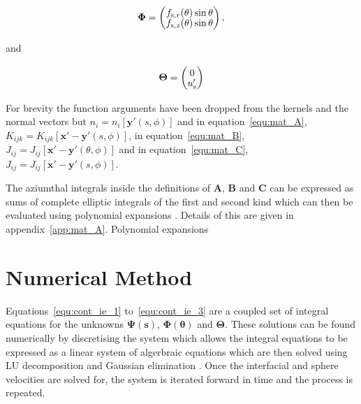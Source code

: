 \documentclass[12pt]{article}
\begin{document}
\begin{equation}
\setlength{\arraycolsep}{5pt}
\renewcommand{\arraystretch}{1.3}
\boldsymbol{\Phi} = \left( \begin{matrix}
f_{\text{s},r}(\theta) \sin\theta \\[-5pt]
f_{\text{s},z}(\theta) \sin\theta \\
\end{matrix} \right)  ,
\label{equ:vec_b}
\end{equation}

and 

\begin{equation}
\setlength{\arraycolsep}{5pt}
\renewcommand{\arraystretch}{1.3}
\boldsymbol{\Theta} = \left( \begin{matrix}
0 \\[-5pt]
u'_{\text{s}} \\
\end{matrix} \right) 
\label{equ:vec_d}
\end{equation}

For brevity the function arguments have been dropped from the kernels and the normal vectors but $n_{i} = n_{i}[\boldsymbol{y'}(s, \phi)]$ and in equation~\ref{equ:mat_A}, $K_{ijk} = K_{ijk}[\boldsymbol{x'} - \boldsymbol{y'}(s, \phi)]$, in equation~\ref{equ:mat_B}, $J_{ij} = J_{ij}[\boldsymbol{x'} - \boldsymbol{y'}(\theta, \phi)]$ and in equation~\ref{equ:mat_C}, $J_{ij} = J_{ij}[\boldsymbol{x'} - \boldsymbol{y'}(s, \phi)]$.

The aziumthal integrals inside the definitions of $\boldsymbol{A}$, $\boldsymbol{B}$ and $\boldsymbol{C}$ can be expressed as sums of complete elliptic integrals of the first and second kind \citep{Lee82, Geller86, Graziani89, Pozrikidis92, Manga94, Roumeliotis00} which can then be evaluated using polynomial expansions \citep{Abramowitz72}. Details of this are given in appendix~\ref{app:mat_A}. Polynomial expansions

\section{Numerical Method}
\label{sec:num_meth}

Equations~\ref{equ:cont_ie_1} to~\ref{equ:cont_ie_3} are a coupled set of integral equations for the unknowns $\boldsymbol{\Psi(s)}$, $\boldsymbol{\Phi(\theta)}$ and $\boldsymbol{\Theta}$. These solutions can be found numerically by discretising the system which allows the integral equations to be expressed as a linear system of algerbraic equations which are then solved using LU decomposition and Gaussian elimination \citep{Riley06, Press07}. Once the interfacial and sphere velocities are solved for, the system is iterated forward in time and the process is repeated. 
\end{document}
